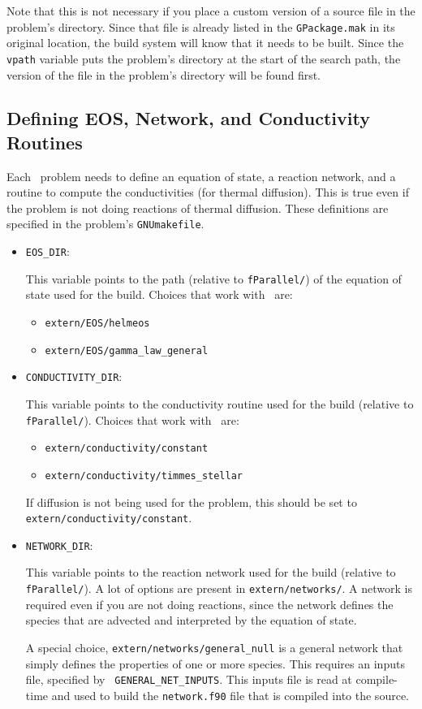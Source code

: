Note that this is not necessary if you place a custom version of 
a source file in the problem's directory.  Since that file is already
listed in the {\tt GPackage.mak} in its original location, the build
system will know that it needs to be built.  Since the {\tt vpath}
variable puts the problem's directory at the start of the search
path, the version of the file in the problem's directory will be 
found first.

\subsection{Defining EOS, Network, and Conductivity Routines}

Each \maestro\ problem needs to define an equation of state, a
reaction network, and a routine to compute the conductivities (for
thermal diffusion).  This is true even if the problem is not doing
reactions of thermal diffusion.  These definitions are specified
in the problem's {\tt GNUmakefile}.

\begin{itemize}
\item {\tt EOS\_DIR}:

  This variable points to the path (relative to {\tt fParallel/}) of
  the equation of state used for the build.  Choices that work
  with \maestro\ are:
  \begin{itemize}
  \item {\tt extern/EOS/helmeos}
  \item {\tt extern/EOS/gamma\_law\_general}
  \end{itemize}

\item {\tt CONDUCTIVITY\_DIR}:

  This variable points to the conductivity routine used for the build
  (relative to {\tt fParallel/}).  Choices that work with \maestro\
  are:
  \begin{itemize}
  \item {\tt extern/conductivity/constant}
  \item {\tt extern/conductivity/timmes\_stellar}
  \end{itemize}
  If diffusion is not being used for the problem, this should be set
  to {\tt extern/conductivity/constant}.

\item {\tt NETWORK\_DIR}:

  This variable points to the reaction network used for the build
  (relative to {\tt fParallel/}).  A lot of options are present in
  {\tt extern/networks/}.  A network is required even if you are not
  doing reactions, since the network defines the species that are
  advected and interpreted by the equation of state.  

  A special choice, {\tt extern/networks/general\_null} is a general
  network that simply defines the properties of one or more species.
  This requires an inputs file, specified by {\tt
  GENERAL\_NET\_INPUTS}.  This inputs file is read at compile-time and
  used to build the {\tt network.f90} file that is compiled into the
  source.

\end{itemize}


